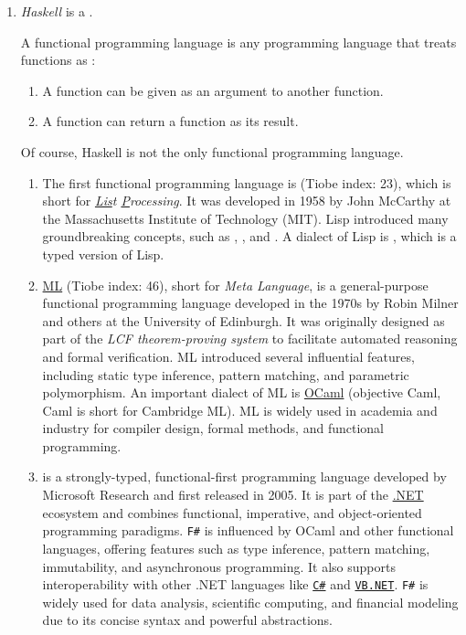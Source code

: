 \begin{enumerate}
\item \textsl{Haskell} is a .

  A functional programming language is any programming language that treats functions as
  :
  \begin{enumerate}
  \item A function can be given as an argument to another function.
  \item A function can return a function as its result.
  \end{enumerate}
  Of course, Haskell is not the only functional programming language.
  \begin{enumerate}
  \item The first functional programming language is  (Tiobe index: 23), which is short for
        \textit{\underline{Lis}t \underline{P}rocessing}. 
        It was developed in 1958 by John McCarthy at the Massachusetts Institute of Technology (MIT). 
        Lisp introduced many groundbreaking concepts, such as , ,
        and . A dialect of Lisp is , which is a typed version of Lisp.
  \item \href{https://en.wikipedia.org/wiki/ML_(programming_language)}{ML} (Tiobe index: 46), short for
        \textit{Meta Language}, is a general-purpose functional programming language 
        developed in the 1970s by Robin Milner and others at the University of Edinburgh. It was originally
        designed as part of the \textit{LCF theorem-proving system} to facilitate automated reasoning and formal
        verification.  ML introduced several influential features, including static type inference, pattern
        matching, and parametric polymorphism.  An important dialect of ML is
        \href{https://en.wikipedia.org/wiki/OCaml}{OCaml} (objective Caml, Caml is short for Cambridge ML).  ML
        is widely used in academia and 
        industry for compiler design, formal methods, and functional programming.
  \item \href{https://en.wikipedia.org/wiki/F_Sharp_(programming_language)}{} is a strongly-typed,
        functional-first programming language developed by Microsoft Research 
        and first released in 2005. It is part of the \href{https://en.wikipedia.org/wiki/.NET_Framework}{.NET}
        ecosystem and combines functional, imperative, and object-oriented programming paradigms.  \texttt{F\#}
        is influenced by OCaml and other functional languages, offering 
        features such as type inference, pattern matching, immutability, and asynchronous programming. It also
        supports interoperability with other .NET languages like
        \href{https://en.wikipedia.org/wiki/C_Sharp_(programming_language)}{\texttt{C\#}} and 
        \href{https://en.wikipedia.org/wiki/.NET_Framework}{\texttt{VB.NET}}. \texttt{F\#} is widely used for data
        analysis, scientific computing, and financial modeling due to its concise syntax and powerful
        abstractions.


\end{enumerate}
\end{enumerate}

